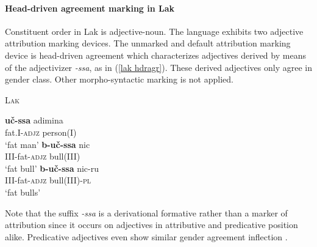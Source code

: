\paragraph{Head-driven agreement marking in Lak}
Constituent order in Lak is adjec\-tive-noun. The language exhibits two adjective attribution marking devices. The unmarked and default attribution marking device is head-driven agreement which characterizes adjectives derived by means of the adjectivizer \mbox{\textit{-ssa}}, as in (\ref{lak hdragr}). These derived adjectives only agree in gender class. Other morpho-syntactic marking is not applied.
\begin{exe}
\ex \textsc{Lak} \cite[48]{zirkov1955} \label{lak hdragr}
\begin{xlist}
\ex 
\gll	\textbf{uč-ssa} adimina\\
	fat.\textsc{I}-\textsc{adjz} person(\textsc{I})\\
\glt	‘fat man’
\gll	\textbf{b-uč-ssa} nic\\
	\textsc{III}-fat-\textsc{adjz} bull\textsc{(III)}\\
\glt	‘fat bull’
\ex
\gll	\textbf{b-uč-ssa} nic-ru\\
	\textsc{III}-fat-\textsc{adjz} bull\textsc{(III)}-\textsc{pl}\\
\glt	‘fat bulls’
\end{xlist}
\end{exe}
Note that the suffix \textit{-ssa} is a derivational formative rather than a marker of attribution since it occurs on adjectives in attributive and predicative position alike. Predicative adjectives even show similar gender agreement inflection \citep[45–51]{zirkov1955}.

